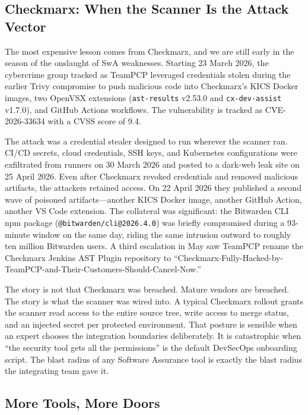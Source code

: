 \subsection*{Checkmarx: When the Scanner Is the Attack Vector}

The most expensive lesson comes from Checkmarx, and we are still early in the season of the onslaught of SwA weaknesses. Starting 23 March 2026, the cybercrime group tracked as TeamPCP leveraged credentials stolen during the earlier Trivy compromise to push malicious code into Checkmarx's KICS Docker images, two OpenVSX extensions (\texttt{ast-results} v2.53.0 and \texttt{cx-dev-assist} v1.7.0), and GitHub Actions workflows.\autocites{20260525:checkmarx}{20260525:register} The vulnerability is tracked as CVE-2026-33634 with a CVSS score of 9.4.

The attack was a credential stealer designed to run wherever the scanner ran. CI/CD secrets, cloud credentials, SSH keys, and Kubernetes configurations were exfiltrated from runners on 30 March 2026 and posted to a dark-web leak site on 25 April 2026.\autocite{20260525:securityweek} Even after Checkmarx revoked credentials and removed malicious artifacts, the attackers retained access. On 22 April 2026 they published a second wave of poisoned artifacts---another KICS Docker image, another GitHub Action, another VS Code extension. The collateral was significant: the Bitwarden CLI npm package (\texttt{@bitwarden/cli@2026.4.0}) was briefly compromised during a 93-minute window on the same day, riding the same intrusion outward to roughly ten million Bitwarden users.\autocite{20260525:bitwarden} A third escalation in May saw TeamPCP rename the Checkmarx Jenkins AST Plugin repository to ``Checkmarx-Fully-Hacked-by-TeamPCP-and-Their-Customers-Should-Cancel-Now.''\autocite{20260525:thn}

The story is not that Checkmarx was breached. Mature vendors are breached. The story is what the scanner was wired into. A typical Checkmarx rollout grants the scanner read access to the entire source tree, write access to merge status, and an injected secret per protected environment. That posture is sensible when an expert chooses the integration boundaries deliberately. It is catastrophic when ``the security tool gets all the permissions'' is the default DevSecOps onboarding script. The blast radius of any Software Assurance tool is exactly the blast radius the integrating team gave it.

\subsection*{More Tools, More Doors}

